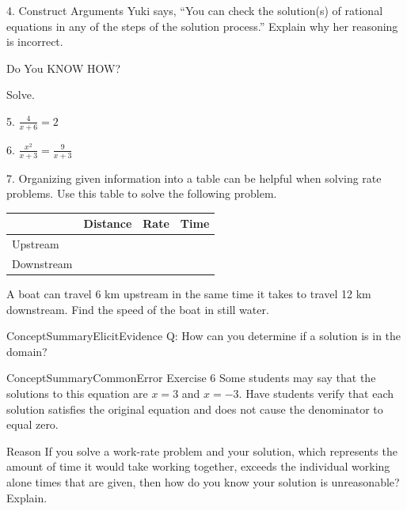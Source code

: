 \documentclass{article}
\newenvironment{concept-summary}{}{}    %
\newenvironment{practice}[2]{}{}        %
\newenvironment{te-addendum}[2]{}{}     %
\newcommand{\answer}[1]{}               %
\newcommand{\placeholder}[2]{}          %
\begin{document}
\begin{concept-summary}
4. Construct Arguments Yuki says, ``You can check the solution(s) of rational equations in any of the steps of the solution process.'' Explain why her reasoning is incorrect.
\answer{Once the original equation has been multiplied by the LCD, the solution might yield values that are not solutions to the original equation.}

Do You KNOW HOW?

Solve.

5. $\frac{4}{x+6}=2$
\answer{$x=-4$}

6. $\frac{x^2}{x+3}=\frac{9}{x+3}$
\answer{$x=3$}

7. Organizing given information into a table can be helpful when solving rate problems. Use this table to solve the following problem.

\begin{tabular}{llll}
\toprule
 & Distance & Rate & Time \\
\midrule
Upstream & & & \\
Downstream & & & \\
\bottomrule
\end{tabular}

A boat can travel 6 km upstream in the same time it takes to travel 12 km downstream. Find the speed of the boat in still water.

\placeholder{map}{Boat traveling between two bridges; labels ``River Current = 4 km/h,'' ``Upstream: 6 km,'' and ``Downstream: 12 km.''}

\answer{12 km/h}
\end{concept-summary}

\begin{te-addendum}{ConceptSummary}{ElicitEvidence}
Q: How can you determine if a solution is in the domain?
\answer{Substitute the solution into the original equation. The solution is in the domain when the denominators are nonzero and the equation is true.}
\end{te-addendum}

\begin{te-addendum}{ConceptSummary}{CommonError}
Exercise 6 Some students may say that the solutions to this equation are $x=3$ and $x=-3$. Have students verify that each solution satisfies the original equation and does not cause the denominator to equal zero.
\end{te-addendum}

\begin{practice}{8}{3}
Reason If you solve a work-rate problem and your solution, which represents the amount of time it would take working together, exceeds the individual working alone times that are given, then how do you know your solution is unreasonable? Explain.
\answer{The time it takes working combined should be less than any of the individual times.}
\end{practice}
\end{document}
